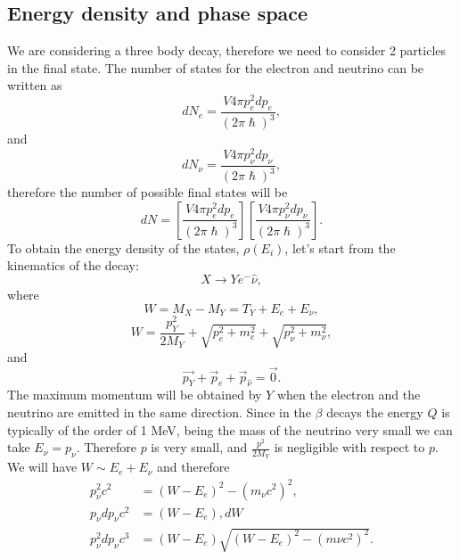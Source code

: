 \subsection{Energy density and phase space}
We are considering a three body decay, therefore we need to consider 2 particles in the final state. The number of states for the electron and neutrino can be written as
\begin{equation*}
    dN_e = \frac{V4\pi p_e^2 dp_e}{(2\pi\hslash)^3},
\end{equation*}
and
\begin{equation*}
    dN_{\nu} = \frac{V4\pi p_{\nu}^2 dp_{\nu}}{(2\pi\hslash)^3},
\end{equation*}
therefore the number of possible final states will be
\begin{equation}
    dN = \left[\frac{V4\pi p_e^2 dp_e}{(2\pi\hslash)^3} \right] \left[\frac{V4\pi p_{\nu}^2 dp_{\nu}}{(2\pi\hslash)^3} \right].
    \label{nuclear-physics-eq:1}
\end{equation}
To obtain the energy density of the states, $\rho(E_i)$, let's start from the kinematics of the decay:
\begin{equation*}
    X \rightarrow Y e^- \hat{\nu},
\end{equation*}
where \begin{equation*}
    W = M_X - M_Y = T_Y + E_e + E_\nu,
\end{equation*}
\begin{equation*}
    W = \frac{p^2_Y}{2M_Y} + \sqrt{p_e^2 + m_e^2} + \sqrt{p_\nu^2 + m_\nu^2},
\end{equation*}
and 
\begin{equation*}
    \Vec{p_Y} + \Vec{p}_e + \Vec{p}_{\hat{\nu}} = \Vec{0}.
\end{equation*}
The maximum momentum will be obtained by $Y$ when the electron and the neutrino are emitted in the same direction. Since in the $\beta$ decays the energy $Q$ is typically of the order of 1 MeV, being the mass of the neutrino very small we can take $E_\nu = p_\nu$. Therefore $p$ is very small, and $\frac{p^2}{2M_Y}$ is negligible with respect to $p$. We will have $W \sim E_e + E_\nu$ and therefore
\begin{equation*}
    \begin{split}
        p_\nu^2c^2 & = (W-E_e)^2 - (m_\nu c^2)^2, \\
        p_\nu dp_{\nu} c^2 & = (W-E_e), dW \\
        p_\nu^2 dp_{\nu} c^3 & = (W-E_e)\sqrt{(W-E_e)^2 - (m\nu c^2)^2}. 
    \end{split}
\end{equation*}
